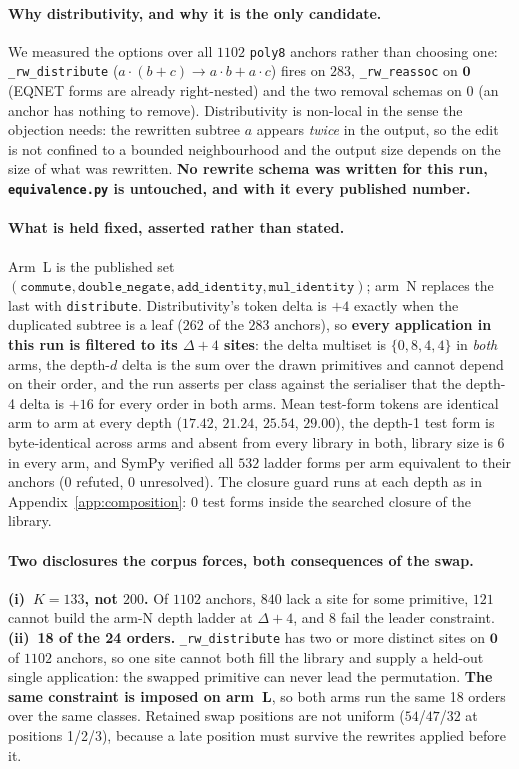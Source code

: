 \paragraph{Why distributivity, and why it is the only candidate.} We measured the options over all $1102$ \texttt{poly8} anchors rather than choosing one: \texttt{\_rw\_distribute} ($a{\cdot}(b{+}c) \to a{\cdot}b + a{\cdot}c$) fires on $283$, \texttt{\_rw\_reassoc} on $\mathbf{0}$ (EQNET forms are already right-nested) and the two removal schemas on $0$ (an anchor has nothing to remove). Distributivity is non-local in the sense the objection needs: the rewritten subtree $a$ appears \emph{twice} in the output, so the edit is not confined to a bounded neighbourhood and the output size depends on the size of what was rewritten. \textbf{No rewrite schema was written for this run, \texttt{equivalence.py} is untouched, and with it every published number.}

\paragraph{What is held fixed, asserted rather than stated.} Arm~L is the published set $(\texttt{commute}, \texttt{double\_negate}, \texttt{add\_identity}, \texttt{mul\_identity})$; arm~N replaces the last with \texttt{distribute}. Distributivity's token delta is $+4$ exactly when the duplicated subtree is a leaf ($262$ of the $283$ anchors), so \textbf{every application in this run is filtered to its $\Delta{+}4$ sites}: the delta multiset is $\{0,8,4,4\}$ in \emph{both} arms, the depth-$d$ delta is the sum over the drawn primitives and cannot depend on their order, and the run asserts per class against the serialiser that the depth-4 delta is $+16$ for every order in both arms. Mean test-form tokens are identical arm to arm at every depth ($17.42$, $21.24$, $25.54$, $29.00$), the depth-1 test form is byte-identical across arms and absent from every library in both, library size is $6$ in every arm, and SymPy verified all $532$ ladder forms per arm equivalent to their anchors ($0$ refuted, $0$ unresolved). The closure guard runs at each depth as in Appendix~\ref{app:composition}: $0$ test forms inside the searched closure of the library.

\paragraph{Two disclosures the corpus forces, both consequences of the swap.} \textbf{(i)~$K{=}133$, not $200$.} Of $1102$ anchors, $840$ lack a site for some primitive, $121$ cannot build the arm-N depth ladder at $\Delta{+}4$, and $8$ fail the leader constraint. \textbf{(ii)~18 of the 24 orders.} \texttt{\_rw\_distribute} has two or more distinct sites on $\mathbf{0}$ of $1102$ anchors, so one site cannot both fill the library and supply a held-out single application: the swapped primitive can never lead the permutation. \textbf{The same constraint is imposed on arm~L}, so both arms run the same 18 orders over the same classes. Retained swap positions are not uniform ($54$/$47$/$32$ at positions 1/2/3), because a late position must survive the rewrites applied before it.

